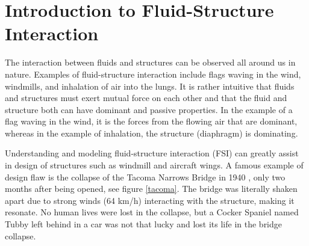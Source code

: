 \chapter{Introduction to Fluid-Structure Interaction}
The interaction between fluids and structures can be observed all around us in nature.
Examples of fluid-structure interaction include flags waving in the wind, windmills, and inhalation of air into the lungs. It is rather intuitive that fluids and structures must exert mutual force on each other and that the fluid and structure both can have dominant and passive properties. In the example of a flag waving in the wind, it is the forces from the flowing air that are dominant, whereas in the example of inhalation, the structure (diaphragm) is dominating. 

Understanding and modeling fluid-structure interaction (FSI) can greatly assist in design of structures such as windmill and aircraft wings. A famous example of design flaw is the collapse of the Tacoma Narrows Bridge in 1940 \cite{Billah1991}, only two months after being opened, see figure \ref{tacoma}. The bridge was literally shaken apart due to strong winds (64 km/h) interacting with the structure, making it resonate. No human lives were lost in the collapse, but a Cocker Spaniel named Tubby left behind in a car was not that lucky and lost its life in the bridge collapse. \newline

